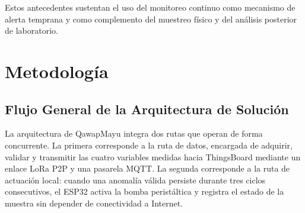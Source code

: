 \documentclass[11pt,a4paper]{article}
\begin{document}
Estos antecedentes sustentan el uso del monitoreo continuo como mecanismo de alerta temprana y como complemento del muestreo físico y del análisis posterior de laboratorio.


\section{Metodología}
\subsection{Flujo General de la Arquitectura de Solución}

La arquitectura de QawapMayu integra dos rutas que operan de forma concurrente. La primera corresponde a la ruta de datos, encargada de adquirir, validar y transmitir las cuatro variables medidas hacia ThingsBoard mediante un enlace LoRa P2P y una pasarela MQTT. La segunda corresponde a la ruta de actuación local: cuando una anomalía válida persiste durante tres ciclos consecutivos, el ESP32 activa la bomba peristáltica y registra el estado de la muestra sin depender de conectividad a Internet.
\end{document}
